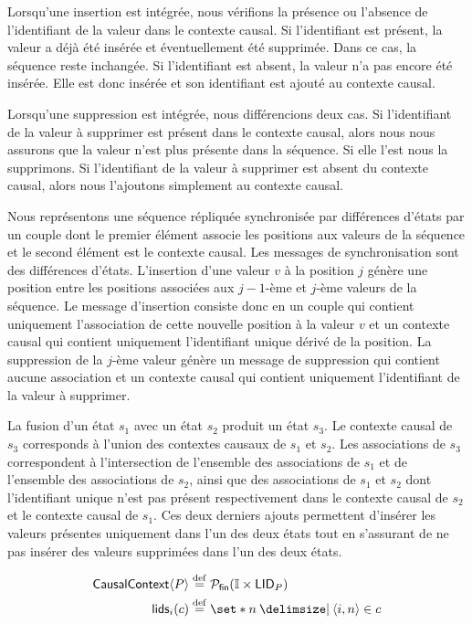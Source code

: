 Lorsqu'une insertion est intégrée, nous vérifions la présence ou l'absence de l'identifiant de la valeur dans le contexte causal.
Si l'identifiant est présent, la valeur a déjà été insérée et éventuellement été supprimée.
Dans ce cas, la séquence reste inchangée.
Si l'identifiant est absent, la valeur n'a pas encore été insérée.
Elle est donc insérée et son identifiant est ajouté au contexte causal.

Lorsqu'une suppression est intégrée, nous différencions deux cas.
Si l'identifiant de la valeur à supprimer est présent dans le contexte causal, alors nous nous assurons que la valeur n'est plus présente dans la séquence.
Si elle l'est nous la supprimons.
Si l'identifiant de la valeur à supprimer est absent du contexte causal, alors nous l'ajoutons simplement au contexte causal.

Nous représentons une séquence répliquée synchronisée par différences d'états par un couple dont le premier élément associe les positions aux valeurs de la séquence et le second élément est le contexte causal.
Les messages de synchronisation sont des différences d'états.
L'insertion d'une valeur $v$ à la position $j$ génère une position entre les positions associées aux $j-1$-ème et $j$-ème valeurs de la séquence.
Le message d'insertion consiste donc en un couple qui contient uniquement l'association de cette nouvelle position à la valeur $v$ et un contexte causal qui contient uniquement l'identifiant unique dérivé de la position.
La suppression de la $j$-ème valeur génère un message de suppression qui contient aucune association et un contexte causal qui contient uniquement l'identifiant de la valeur à supprimer.

La fusion d'un état $s_1$ avec un état $s_2$ produit un état $s_3$.
Le contexte causal de $s_3$ corresponds à l'union des contextes causaux de $s_1$ et $s_2$.
Les associations de $s_3$ correspondent à l'intersection de l'ensemble des associations de $s_1$ et de l'ensemble des associations de $s_2$, ainsi que des associations de $s_1$ et $s_2$ dont l'identifiant unique n'est pas présent respectivement dans le contexte causal de $s_2$ et le contexte causal de $s_1$.
Ces deux derniers ajouts permettent d'insérer les valeurs présentes uniquement dans l'un des deux états tout en s'assurant de ne pas insérer des valeurs supprimées dans l'un des deux états.

\begin{align*}
\trm{CausalContext}\tuple*{P} &\defeq \powerfset{\mathbb{I} \times \trm{LID}_P}\\
\trm{lids}_i(c) &\defeq \set*{n \given \tuple*{i, n} \in c}
\end{align*}

